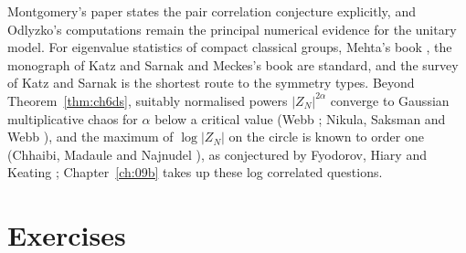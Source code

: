Montgomery's paper \cite{montgomery1973} states the pair correlation conjecture explicitly, and Odlyzko's computations \cite{odlyzko1987} remain the principal numerical evidence for the unitary model. For eigenvalue statistics of compact classical groups, Mehta's book \cite{mehta2004}, the monograph of Katz and Sarnak \cite{katzsarnak1999} and Meckes's book \cite{meckes2019} are standard, and the survey of Katz and Sarnak \cite{katzsarnak1999b} is the shortest route to the symmetry types. Beyond Theorem~\ref{thm:ch6ds}, suitably normalised powers $|Z_N|^{2\alpha}$ converge to Gaussian multiplicative chaos for $\alpha$ below a critical value (Webb \cite{webb2015}; Nikula, Saksman and Webb \cite{nsw2020}), and the maximum of $\log|Z_N|$ on the circle is known to order one (Chhaibi, Madaule and Najnudel \cite{cmn2018}), as conjectured by Fyodorov, Hiary and Keating \cite{fhk2012}; Chapter~\ref{ch:09b} takes up these log correlated questions.

\section{Exercises}

